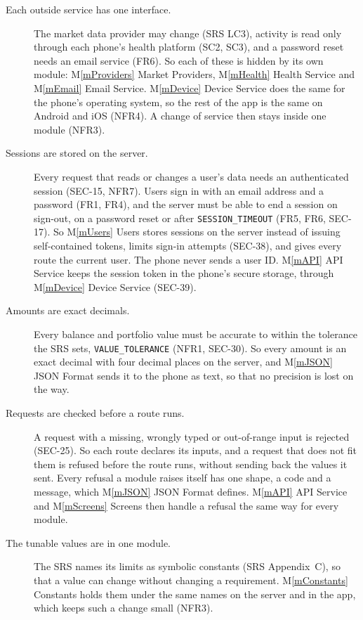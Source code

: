 \documentclass[12pt, titlepage]{article}
\newcommand{\mref}[1]{M\ref{#1}}
\begin{document}
\begin{description}
\item[Each outside service has one interface.] The market data provider may
  change (SRS LC3), activity is read only through each phone's health platform
  (SC2, SC3), and a password reset needs an email service (FR6). So each of
  these is hidden by its own module: \mref{mProviders} Market Providers,
  \mref{mHealth} Health Service and \mref{mEmail} Email Service.
  \mref{mDevice} Device Service does the same for the phone's operating system,
  so the rest of the app is the same on Android and iOS (NFR4). A change of
  service then stays inside one module (NFR3).

\item[Sessions are stored on the server.] Every request that reads or changes a
  user's data needs an authenticated session (SEC-15, NFR7). Users sign in with
  an email address and a password (FR1, FR4), and the server must be able to
  end a session on sign-out, on a password reset or after
  \texttt{SESSION\_TIMEOUT} (FR5, FR6, SEC-17). So \mref{mUsers} Users stores
  sessions on the server instead of issuing self-contained tokens, limits
  sign-in attempts (SEC-38), and gives every route the current user. The phone
  never sends a user ID. \mref{mAPI} API Service keeps the session token in the
  phone's secure storage, through \mref{mDevice} Device Service (SEC-39).

\item[Amounts are exact decimals.] Every balance and portfolio value must be
  accurate to within the tolerance the SRS sets, \texttt{VALUE\_TOLERANCE}
  (NFR1, SEC-30). So every amount is an exact decimal with four decimal places
  on the server, and \mref{mJSON} JSON Format sends it to the phone as text, so
  that no precision is lost on the way.

\item[Requests are checked before a route runs.] A request with a missing,
  wrongly typed or out-of-range input is rejected (SEC-25). So each route
  declares its inputs, and a request that does not fit them is refused before
  the route runs, without sending back the values it sent. Every refusal a
  module raises itself has one shape, a code and a message, which
  \mref{mJSON} JSON Format defines. \mref{mAPI} API Service and
  \mref{mScreens} Screens then handle a refusal the same way for every module.

\item[The tunable values are in one module.] The SRS names its limits as
  symbolic constants (SRS Appendix~C), so that a value can change without
  changing a requirement. \mref{mConstants} Constants holds them under the same
  names on the server and in the app, which keeps such a change small (NFR3).


\end{description}
\end{document}
